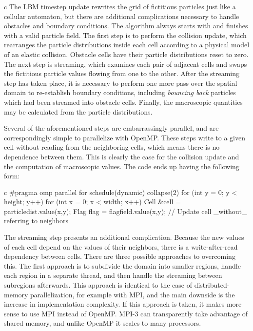 \documentclass[conference, a4paper]{IEEEtran-modified}
\begin{document}
\begin{ccode}[]{c}
The LBM timestep update rewrites the grid of fictitious particles just like a cellular automaton, but there are additional complications necessary to handle obstacles and boundary conditions. The algorithm always starts with and finishes with a valid particle field. The first step is to perform the collision update, which rearranges the particle distributions inside each cell according to a physical model of an elastic collision. Obstacle cells have their particle distributions reset to zero. The next step is streaming, which examines each pair of adjacent cells and swaps the fictitious particle values flowing from one to the other. After the streaming step has taken place, it is necessary to perform one more pass over the spatial domain to re-establish boundary conditions, including \emph{bouncing back} particles which had been streamed into obstacle cells. Finally, the macroscopic quantities may be calculated from the particle distributions.

Several of the aforementioned steps are embarrassingly parallel, and are correspondingly simple to parallelize with OpenMP. These steps write to a given cell without reading from the neighboring cells, which means there is no dependence between them. This is clearly the case for the collision update and the computation of macroscopic values. The code ends up having the following form:

\begin{ccode}[]
{c}
        #pragma omp parallel for schedule(dynamic) collapse(2)
        for (int y = 0; y < height; y++) {
          for (int x = 0; x < width; x++) {
            Cell &cell = particledist.value(x,y);
            Flag flag = flagfield.value(x,y);
            // Update cell _without_ referring to neighbors
          }
        }
\end{ccode}

The streaming step presents an additional complication. Because the new values of each cell depend on the values of their neighbors, there is a write-after-read dependency between cells. There are three possible approaches to overcoming this. The first approach is to subdivide the domain into smaller regions, handle each region in a separate thread, and then handle the streaming between subregions afterwards. This approach is identical to the case of distributed-memory parallelization, for example with MPI, and the main downside is the increase in implementation complexity. If this approach is taken, it makes more sense to use MPI instead of OpenMP. MPI-3 can transparently take advantage of shared memory, and unlike OpenMP it scales to many processors.


\end{ccode}
\end{document}
